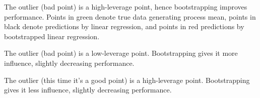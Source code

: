\begin{refsection}
\begin{example}
The outlier (bad point) is a high-leverage point, hence bootstrapping improves performance. Points in green denote true data generating process mean, points in black denote predictions by linear regression, and points in red predictions by bootstrapped linear regression.

\end{example}

\begin{example}
The outlier (bad point) is a low-leverage point. Bootstrapping gives it more influence, slightly decreasing performance.

\end{example}

\begin{example}
The outlier (this time it's a good point) is a high-leverage point. Bootstrapping gives it less influence, slightly decreasing performance.


\end{example}
\end{refsection}
